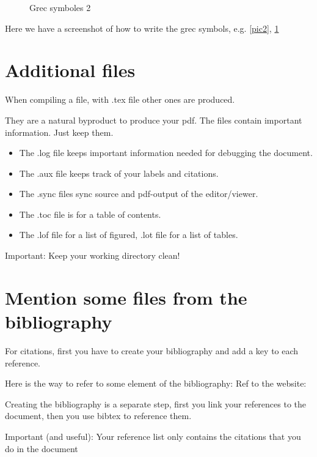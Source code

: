 \documentclass{article}
\begin{document}
\begin{figure}[H]
\centerline {}
\caption{Grec symboles 2}
\label{pic3}
\end{figure}


Here we have a screenshot of how to write the grec symbols, e.g. \ref{pic2}, \ref{pic3}

\section{Additional files}

When compiling a file, with .tex file other ones are produced.

They are a natural byproduct to produce your pdf. The files contain important information. Just keep them.

\begin{itemize}
\item The .log file keeps important information needed for debugging the document.
\item The .aux file keeps track of your labels and citations.
\item The .sync files sync source and pdf-output of the editor/viewer.
\item The .toc file is for a table of contents.
\item The .lof file for a list of figured, .lot file for a list of tables.
\end{itemize}

Important: Keep your working directory clean!



\section{Mention some files from the bibliography}
For citations, first you have to create your bibliography and add a key to each
reference.

Here is the way to refer to some element of the bibliography:  
\cite[Pag 13]{leduc2008road}
Ref to the website:  \cite{ECG}

Creating the bibliography is a separate step, first you link your references to the 
document, then you use bibtex to reference them.

Important (and useful): Your reference list only contains the citations that
you do in the document




\end{document}
